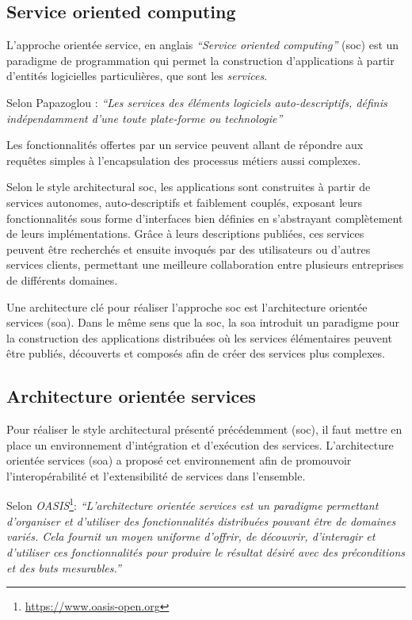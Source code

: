   \subsection{Service oriented computing}
  \label{sec:soc}
  L'approche orientée service, en anglais \textit{``Service oriented
    computing''} (\acrshort{soc}) est un paradigme de programmation
  qui permet la construction d'applications à partir d'entités
  logicielles particulières, que sont les \emph{services}.\bigskip

  Selon Papazoglou \cite{papazoglou2003service}: \textit{``Les
    services des éléments logiciels auto-descriptifs, définis
    indépendamment d'une toute plate-forme ou technologie''}\bigskip

  Les fonctionnalités offertes par un service peuvent allant de
  répondre aux requêtes simples à l'encapsulation des processus
  métiers aussi complexes.\medskip

  Selon le style architectural \acrshort{soc}, les applications sont
  construites à partir de services autonomes, auto-descriptifs et
  faiblement couplés, exposant leurs fonctionnalités sous forme
  d'interfaces bien définies en s'abstrayant complètement de leurs
  implémentations. Grâce à leurs descriptions publiées, ces services
  peuvent être recherchés et ensuite invoqués par des utilisateurs ou
  d'autres services clients, permettant une meilleure collaboration
  entre plusieurs entreprises de différents domaines.\medskip

  Une architecture clé pour réaliser l'approche \acrshort{soc} est
  l'architecture orientée services (\acrshort{soa}). Dans le même
  sens que la \acrshort{soc}, la \acrshort{soa} introduit un paradigme
  pour la construction des applications distribuées où les services
  élémentaires peuvent être publiés, découverts et composés afin de
  créer des services plus complexes.

  \subsection{Architecture orientée services}
  \label{sec:soa}
  Pour réaliser le style architectural présenté précédemment
  (\acrshort{soc}), il faut mettre en place un environnement
  d'intégration et d'exécution des services. L'architecture orientée
  services (\acrshort{soa}) a proposé cet environnement afin de
  promouvoir l'interopérabilité et l'extensibilité de services dans
  l'ensemble.\bigskip

  Selon \textit{OASIS}\footnote{\url{https://www.oasis-open.org}}:
  \textit{``L'architecture orientée services est un paradigme
    permettant d'organiser et d'utiliser des fonctionnalités
    distribuées pouvant être de domaines variés. Cela fournit un moyen
    uniforme d'offrir, de découvrir, d'interagir et d'utiliser ces
    fonctionnalités pour produire le résultat désiré avec des
    préconditions et des buts mesurables.''}\bigskip

